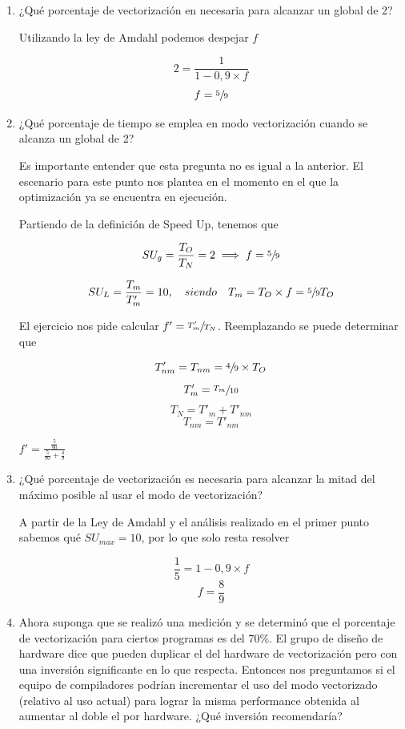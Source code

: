 \begin{enumerate}
 \item ¿Qué porcentaje de vectorización en necesaria para alcanzar un \SU global de 2?

 Utilizando la ley de Amdahl podemos despejar $f$

 $$ 2 = \frac{1}{1 - 0,9 \times f}$$
 $$ f  = \sfrac{5}{9} $$
 
 \item ¿Qué porcentaje de tiempo se emplea en modo vectorización cuando se alcanza un \SU global de 2?

 Es importante entender que esta pregunta no es igual a la anterior. El escenario para este punto nos plantea en el momento en el que 
 la optimización ya se encuentra en ejecución.

 Partiendo de la definición de Speed Up, tenemos que 

 $$ SU_g = \frac{T_O}{T_N} = 2 \implies f = \sfrac{5}{9} $$

 $$ SU_L = \frac{T_m}{T'_m} = 10,\quad siendo \quad T_m = T_O \times f = \sfrac{5}{9}T_O $$

 El ejercicio nos pide calcular $ f' = \sfrac{T'_m}{T_N} $. Reemplazando se puede determinar que
 
 $$ T'_{nm} = T_{nm} = \sfrac{4}{9} \times T_O $$
 $$ T'_m =  \sfrac{T_m}{10} $$ 
 $$ T_N = T'_{m} + T'_{nm} $$
 $$ T_{nm} = T'_{nm} $$ 
 
 $ f' = \frac{\frac{5}{90}}{\frac{5}{90} + \frac{4}{9}} $
 
 \item ¿Qué porcentaje de vectorización es necesaria para alcanzar la mitad del máximo \SU posible al usar el modo de vectorización?

 A partir de la Ley de Amdahl y el análisis realizado en el primer punto sabemos qué $SU_{max} = 10$, por lo que solo resta resolver

 $$ \frac{1}{5} = 1 - 0,9 \times f $$
 $$ f = \frac{8}{9} $$ 
 
 \item Ahora suponga que se realizó una medición y se determinó que el porcentaje de vectorización para ciertos programas es del 70\%. El grupo de diseño de hardware dice que pueden duplicar el \SU del hardware de vectorización pero con una inversión significante en lo que respecta. Entonces nos preguntamos si el equipo de compiladores podrían incrementar el uso del modo vectorizado (relativo al uso actual) para lograr la misma performance obtenida al aumentar al doble el \SU por hardware. ¿Qué inversión recomendaría?  

\end{enumerate}


